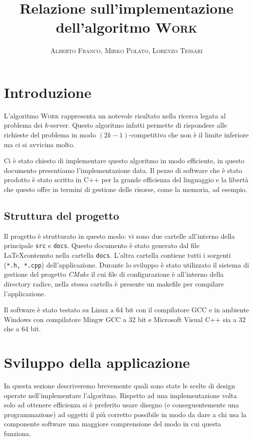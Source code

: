 \documentclass[a4paper, 10pt]{article}
\begin{document}
    \title{Relazione sull'implementazione dell'algoritmo \textsc{Work}}
    \author{\textsc{Alberto Franco, Mirko Polato, Lorenzo Tessari}}
    \maketitle

\section{Introduzione}    
L'algoritmo \textsc{Work} rappresenta un notevole risultato nella ricerca
legata al problema dei $k$-server. Questo algoritmo infatti permette di 
rispondere alle richieste del problema in modo $(2k - 1)$-competitivo che 
non è il limite inferiore ma ci si avvicina molto. 

Ci è stato chiesto di implementare questo algoritmo in modo efficiente, in 
questo documento presentiamo l'implementazione data. Il pezzo di software che 
è stato prodotto è stato scritto in C++ per la grande efficienza del 
linguaggio e la libertà che questo offre in termini di gestione delle risorse,
come la memoria, ad esempio.

\subsection{Struttura del progetto}
Il progetto è strutturato in questo modo: vi sono due cartelle all'interno della
principale \texttt{src} e \texttt{docs}. Questo documento è stato generato dal 
file \LaTeX contenuto nella cartella \texttt{docs}. L'altra cartella contiene 
tutti i sorgenti (\texttt{*.h, *.cpp}) dell'applicazione. Durante lo sviluppo
è stato utilizzato il sistema di gestione del progetto \emph{CMake} il cui
file di configurazione è all'interno della directory radice, nella stessa
cartella è presente un makefile per compilare l'applicazione. 

Il software è stato testato su Linux a 64 bit con il compilatore GCC e in 
ambiente Windows con compilatore Mingw GCC a 32 bit e Microsoft Visual C++
sia a 32 che a 64 bit.

\section{Sviluppo della applicazione}
In questa sezione descriveremo brevemente quali sono state le scelte di design
operate nell'implementare l'algoritmo. Rispetto ad una implementazione volta
solo ad ottenere efficienza si è preferito usare disegno (e conseguentemente
una programmazione) ad oggetti il più corretto possibile in modo da dare 
a chi usa la componente software una maggiore comprensione del modo in cui questa
funziona. 
\end{document}
